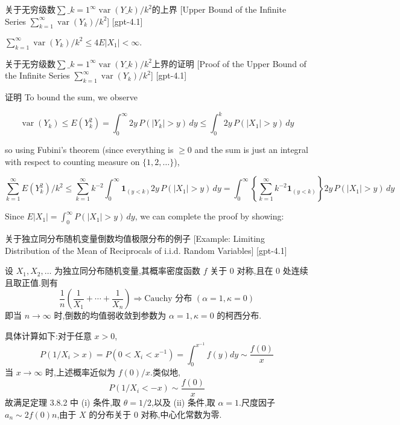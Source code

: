 \documentclass[UTF8]{ctexart}
\begin{document}
    
    
    \begin{lma}
        [Upper-Bound-of-the-Infinite-Series-$\sum-{k=1}^{\infty}-\operatorname{var}Y-{k}/k^{2}$]
        {关于无穷级数$\sum\_{k=1}^{\infty} \operatorname{var}(Y\_{k})/k^{2}$的上界}
        [Upper Bound of the Infinite Series $\sum_{k=1}^{\infty} \operatorname{var}(Y_{k})/k^{2}$]
        [gpt-4.1]
        
$\sum_{k=1}^{\infty} \operatorname{var}(Y_{k})/k^{2} \leq 4 E|X_{1}| < \infty.$

    \end{lma}
    
    
    
    \begin{prf}
        [Proof-of-the-Upper-Bound-of-the-Infinite-Series-$\sum-{k=1}^{\infty}-\operatorname{var}Y-{k}/k^{2}$]
        {关于无穷级数$\sum\_{k=1}^{\infty} \operatorname{var}(Y\_{k})/k^{2}$上界的证明}
        [Proof of the Upper Bound of the Infinite Series $\sum_{k=1}^{\infty} \operatorname{var}(Y_{k})/k^{2}$]
        [gpt-4.1]
        
证明 To bound the sum, we observe

\[
\operatorname{var}(Y_{k}) \leq E(Y_{k}^{2}) = \int_{0}^{\infty} 2y\, P(|Y_{k}| > y)\, dy \leq \int_{0}^{k} 2y\, P(|X_{1}| > y)\, dy
\]

so using Fubini's theorem (since everything is $\geq 0$ and the sum is just an integral with respect to counting measure on $\{1, 2, \ldots\}$),

\[
\sum_{k=1}^{\infty} E(Y_{k}^{2})/k^{2} \leq \sum_{k=1}^{\infty} k^{-2} \int_{0}^{\infty} \mathbf{1}_{(y < k)} 2y\, P(|X_{1}| > y)\, dy
= \int_{0}^{\infty} \left\{ \sum_{k=1}^{\infty} k^{-2} \mathbf{1}_{(y < k)} \right\} 2y\, P(|X_{1}| > y)\, dy
\]

Since $E|X_{1}| = \int_{0}^{\infty} P(|X_{1}| > y)\, dy$, we can complete the proof by showing:

    \end{prf}
    
    
    
    \begin{xmp}
        {关于独立同分布随机变量倒数均值极限分布的例子}
        [Example: Limiting Distribution of the Mean of Reciprocals of i.i.d. Random Variables]
        [gpt-4.1]
        
设 $X_1, X_2, \dots$ 为独立同分布随机变量,其概率密度函数 $f$ 关于 $0$ 对称,且在 $0$ 处连续且取正值.则有
\[
\frac{1}{n} \left( \frac{1}{X_1} + \cdots + \frac{1}{X_n} \right) \Rightarrow \text{Cauchy 分布 } (\alpha = 1, \kappa = 0)
\]
即当 $n \to \infty$ 时,倒数的均值弱收敛到参数为 $\alpha=1, \kappa=0$ 的柯西分布.

具体计算如下:对于任意 $x > 0$,
\[
P(1/X_i > x) = P(0 < X_i < x^{-1}) = \int_0^{x^{-1}} f(y) dy \sim \frac{f(0)}{x}
\]
当 $x \to \infty$ 时,上述概率近似为 $f(0)/x$.类似地,
\[
P(1/X_i < -x) \sim \frac{f(0)}{x}
\]
故满足定理 3.8.2 中 (i) 条件,取 $\theta = 1/2$,以及 (ii) 条件,取 $\alpha=1$.尺度因子 $a_n \sim 2 f(0) n$,由于 $X$ 的分布关于 $0$ 对称,中心化常数为零.

    \end{xmp}
    
\end{document}
